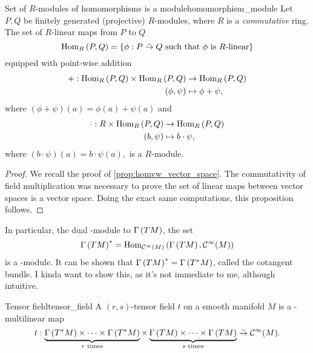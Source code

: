 \begin{proposition}{Set of \(R\)-modules of homomorphisms is a module}{homomorphism_module}
    Let \(P, Q\) be finitely generated (projective) \(R\)-modules, where \(R\) is a \emph{commutative} ring. The set of \(R\)-linear maps from \(P\) to \(Q\)
    \begin{equation*}
        \Hom[R]{P,Q}= \set*{\phi : P \linear Q \text{ such that }\phi\text{ is }R\text{-linear}}
    \end{equation*}
    equipped with point-wise addition
    \begin{align*}
        + :  \Hom[R]{P,Q} \times \Hom[R]{P,Q} &\to \Hom[R]{P,Q}\\
                                  (\phi,\psi) &\mapsto \phi+\psi,
    \end{align*}
    where \((\phi+\psi)(a) = \phi(a) + \psi(a)\) and
    \begin{align*}
        \cdot : R \times \Hom[R]{P,Q} &\to \Hom[R]{P,Q}\\
                                  (b,\psi) &\mapsto b\cdot\psi,
    \end{align*}
    where \((b\cdot\psi)(a) = b \cdot \psi(a),\) is a \(R\)-module.
\end{proposition}
\begin{proof}
    We recall the proof of \cref{prop:homvw_vector_space}. The commutativity of field multiplication was necessary to prove the set of linear maps between vector spaces is a vector space. Doing the exact same computations, this proposition follows.
\end{proof}

In particular, the dual -module to \(\sections{TM}\), the set
\begin{equation*}
    \sections{TM}^{\ast} = \Hom[\smooth{M}]{\sections{TM}, \smooth{M}}
\end{equation*}
is a -module. It can be shown that \(\sections{TM}^{\ast} = \sections{T^{\ast}M}\), called the cotangent bundle. {\color{Red} I kinda want to show this, as it's not immediate to me, although intuitive.}


\begin{definition}{Tensor field}{tensor_field}
    A \((r,s)\)-tensor field \(t\) on a smooth manifold \(M\) is a -multilinear map
    \begin{equation*}
        t : \underbrace{\sections{T^{\ast}M} \times \dots \times \sections{T^{\ast}M}}_{r \text{ times}} \times \underbrace{\sections{TM}\times \dots \times \sections{TM}}_{s \text{ times}} \linear \smooth{M}.
    \end{equation*}
\end{definition}

